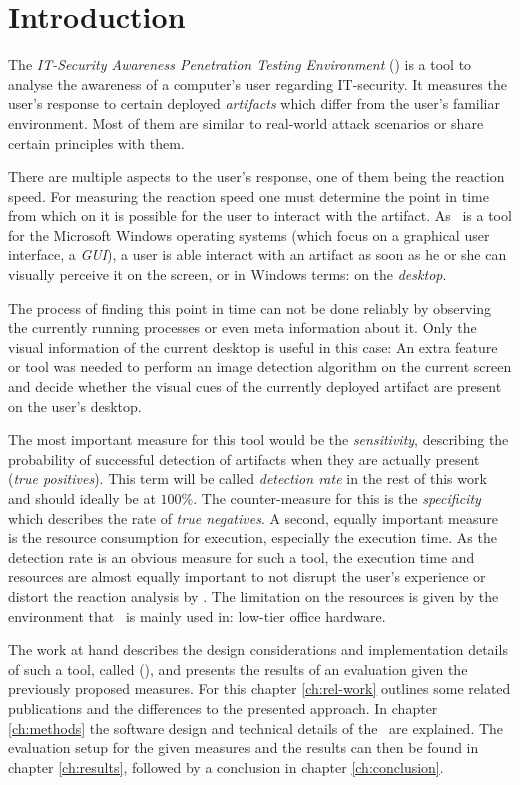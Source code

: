 \chapter{Introduction}\label{ch:intro}

The \emph{IT-Security Awareness Penetration Testing Environment} (\ape) \cite{itsape} is a tool to analyse the awareness of a computer's user regarding IT-security. It measures the user's response to certain deployed \emph{artifacts} which differ from the user's familiar environment. Most of them are similar to real-world attack scenarios or share certain principles with them.

There are multiple aspects to the user's response, one of them being the reaction speed. For measuring the reaction speed one must determine the point in time from which on it is possible for the user to interact with the artifact. As \ape~is a tool for the Microsoft Windows operating systems (which focus on a graphical user interface, a \emph{GUI}), a user is able interact with an artifact as soon as he or she can visually perceive it on the screen, or in Windows terms: on the \emph{desktop}.

The process of finding this point in time can not be done reliably by observing the currently running processes or even meta information about it. Only the visual information of the current desktop is useful in this case: An extra feature or tool was needed to perform an image detection algorithm on the current screen and decide whether the visual cues of the currently deployed artifact are present on the user's desktop.

The most important measure for this tool would be the \emph{sensitivity}, describing the probability of successful detection of artifacts when they are actually present (\emph{true positives}). This term will be called \emph{detection rate} in the rest of this work and should ideally be at $100\%$. The counter-measure for this is the \emph{specificity} which describes the rate of \emph{true negatives}. A second, equally important measure is the resource consumption for execution, especially the execution time. As the detection rate is an obvious measure for such a tool, the execution time and resources are almost equally important to not disrupt the user's experience or distort the reaction analysis by \ape. The limitation on the resources is given by the environment that \ape~is mainly used in: low-tier office hardware.

The work at hand describes the design considerations and implementation details of such a tool, called \emph{\vad} (\emph{\vd}), and presents the results of an evaluation given the previously proposed measures. For this chapter \ref{ch:rel-work} outlines some related publications and the differences to the presented approach. In chapter \ref{ch:methods} the software design and technical details of the \vd~are explained. The evaluation setup for the given measures and the results can then be found in chapter \ref{ch:results}, followed by a conclusion in chapter \ref{ch:conclusion}.

